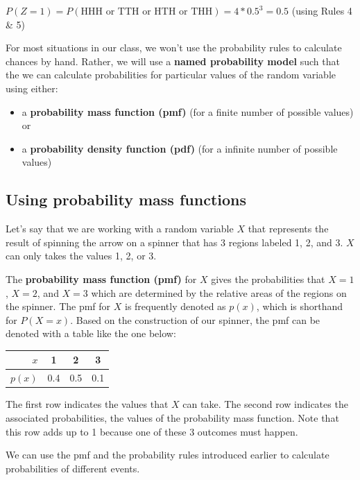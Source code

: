 \documentclass[
]{book}
\providecommand{\tightlist}{%
  \setlength{\itemsep}{0pt}\setlength{\parskip}{0pt}}
\begin{document}
\(P(Z = 1) = P(\text{HHH or TTH or HTH or THH}) = 4*0.5^3 = 0.5\) (using Rules 4 \& 5)

For most situations in our class, we won't use the probability rules to calculate chances by hand. Rather, we will use a \textbf{named probability model} such that the we can calculate probabilities for particular values of the random variable using either:

\begin{itemize}
\tightlist
\item
  a \textbf{probability mass function (pmf)} (for a finite number of possible values) or
\item
  a \textbf{probability density function (pdf)} (for a infinite number of possible values)
\end{itemize}

\subsection{Using probability mass functions}\label{using-probability-mass-functions}

Let's say that we are working with a random variable \(X\) that represents the result of spinning the arrow on a spinner that has 3 regions labeled 1, 2, and 3. \(X\) can only takes the values 1, 2, or 3.

The \textbf{probability mass function (pmf)} for \(X\) gives the probabilities that \(X=1\), \(X=2\), and \(X=3\) which are determined by the relative areas of the regions on the spinner. The pmf for \(X\) is frequently denoted as \(p(x)\), which is shorthand for \(P(X = x)\). Based on the construction of our spinner, the pmf can be denoted with a table like the one below:

\begin{longtable}[]{@{}rccc@{}}
\toprule\noalign{}
\(x\) & 1 & 2 & 3 \\
\midrule\noalign{}
\endhead
\bottomrule\noalign{}
\endlastfoot
\(p(x)\) & 0.4 & 0.5 & 0.1 \\
\end{longtable}

The first row indicates the values that \(X\) can take. The second row indicates the associated probabilities, the values of the probability mass function. Note that this row adds up to 1 because one of these 3 outcomes must happen.

We can use the pmf and the probability rules introduced earlier to calculate probabilities of different events.
\end{document}
